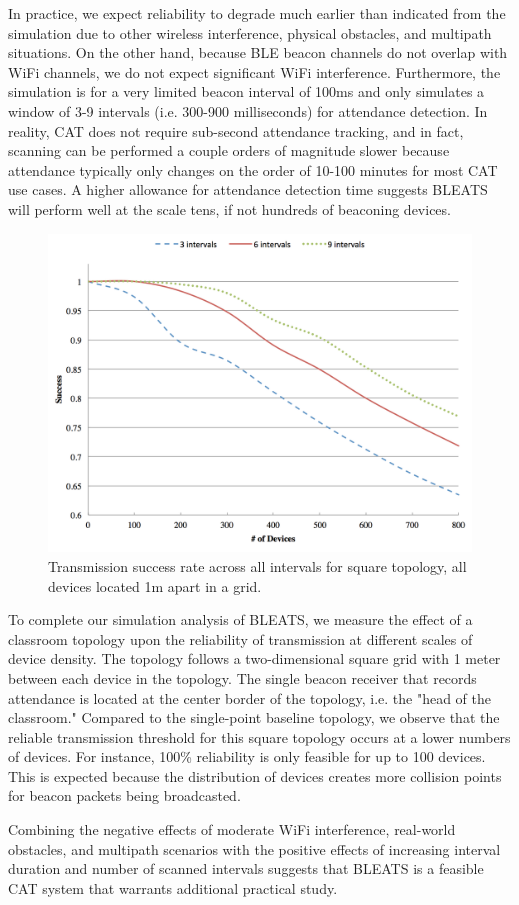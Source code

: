 In practice, we expect reliability to degrade much earlier than indicated from
the simulation due to other wireless interference, physical obstacles, and
multipath situations. On the other hand, because BLE beacon channels do not
overlap with WiFi channels, we do not expect significant WiFi interference.
Furthermore, the simulation is for a very limited beacon interval of 100ms and
only simulates a window of 3-9 intervals (i.e. 300-900 milliseconds) for
attendance detection. In reality, CAT does not require sub-second attendance
tracking, and in fact, scanning can be performed a couple orders of magnitude
slower because attendance typically only changes on the order of 10-100 minutes
for most CAT use cases. A higher allowance for attendance detection time
suggests BLEATS will perform well at the scale tens, if not hundreds of
beaconing devices. 

\begin{figure} \centering
\includegraphics[width=\columnwidth]{figures/square-topo-error.png}
\caption{Transmission success rate across all intervals for square topology, all devices located 1m apart in a grid.}
\label{fig:square-topo-error} \end{figure}

To complete our simulation analysis of BLEATS, we measure the effect of a
classroom topology upon the reliability of transmission at different scales of
device density. The topology follows a two-dimensional square grid with 1 meter
between each device in the topology. The single beacon receiver that records
attendance is located at the center border of the topology, i.e. the "head of
the classroom." Compared to the single-point baseline topology, we observe that
the reliable transmission threshold for this square topology occurs at
a lower numbers of devices. For instance, 100\% reliability is only
feasible for up to 100 devices. This is expected because the distribution of
devices creates more collision points for beacon packets being broadcasted.

Combining the negative effects of moderate WiFi interference, real-world
obstacles, and multipath scenarios with the positive effects of increasing
interval duration and number of scanned intervals suggests that BLEATS is a
feasible CAT system that warrants additional practical study. 




